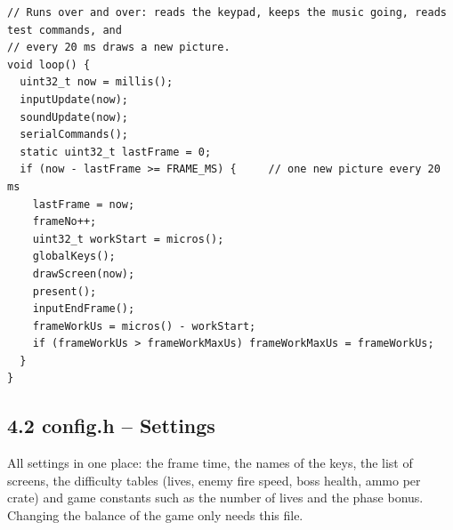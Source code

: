 \documentclass[11pt,a4paper]{article}
\begin{document}
\begin{lstlisting}[language=Arduino]
// Runs over and over: reads the keypad, keeps the music going, reads test commands, and
// every 20 ms draws a new picture.
void loop() {
  uint32_t now = millis();
  inputUpdate(now);
  soundUpdate(now);
  serialCommands();
  static uint32_t lastFrame = 0;
  if (now - lastFrame >= FRAME_MS) {     // one new picture every 20 ms
    lastFrame = now;
    frameNo++;
    uint32_t workStart = micros();
    globalKeys();
    drawScreen(now);
    present();
    inputEndFrame();
    frameWorkUs = micros() - workStart;
    if (frameWorkUs > frameWorkMaxUs) frameWorkMaxUs = frameWorkUs;
  }
}
\end{lstlisting}

\clearpage
\subsection*{4.2 config.h – Settings}
All settings in one place: the frame time, the names of the keys, the list of screens, the difficulty tables (lives, enemy fire speed, boss health, ammo per crate) and game constants such as the number of lives and the phase bonus. Changing the balance of the game only needs this file.
\end{document}
